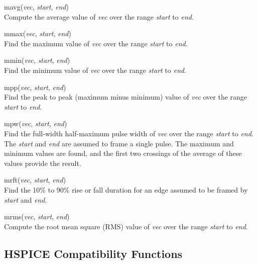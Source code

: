 \begin{description}
\item{\vt mavg}({\it vec\/}, {\it start\/}, {\it end\/})\\
Compute the average value of {\it vec} over the range {\it start} to
{\it end\/}.

\item{\vt mmax}({\it vec\/}, {\it start\/}, {\it end\/})\\
Find the maximum value of {\it vec} over the range {\it start} to {\it
end\/}.

\item{\vt mmin}({\it vec\/}, {\it start\/}, {\it end\/})\\
Find the minimum value of {\it vec} over the range {\it start} to {\it
end\/}.

\item{\vt mpp}({\it vec\/}, {\it start\/}, {\it end\/})\\
Find the peak to peak (maximum minus minimum) value of {\it vec} over
the range {\it start} to {\it end\/}.

\item{\vt mpw}({\it vec\/}, {\it start\/}, {\it end\/})\\
Find the full-width half-maximum pulse width of {\it vec} over the
range {\it start} to {\it end\/}.  The {\it start} and {\it end} are
assumed to frame a single pulse.  The maximum and minimum values are
found, and the first two crossings of the average of these values
provide the result.

\item{\vt mrft}({\it vec\/}, {\it start\/}, {\it end\/})\\
Find the 10\% to 90\% rise or fall duration for an edge assumed to be
framed by {\it start} and {\it end\/}.

\item{\vt mrms}({\it vec\/}, {\it start\/}, {\it end\/})\\
Compute the root mean square (RMS) value of {\it vec} over the range
{\it start} to {\it end\/}.
\end{description}


\subsection{HSPICE Compatibility Functions}

